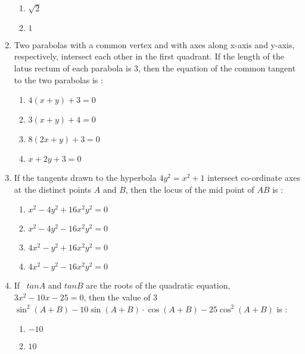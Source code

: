 \documentclass[journal,12pt,twocolumn]{IEEEtran}
\begin{document}
\begin{enumerate}[1.]
\begin{enumerate}[(1)]
\item $
\sqrt{2}
$

\item $
1
$


\end{enumerate}

\item Two parabolas with a common vertex and with axes along x-axis and y-axis, respectively, intersect each other in the first quadrant. If the length of the latus rectum of each parabola is $3$, then the equation of the common tangent to the two parabolas is :


\begin{enumerate}[(1)]
 
\item $
4(x+y)+3=0
$

\item $
3(x+y)+4=0
$

\item $
8(2x+y)+3=0
$

\item $
x+2y+3=0
$


\end{enumerate}

\item If the tangents drawn to the hyperbola $4y^2=x^2+1$ intersect co-ordinate axes at the distinct points $A$ and $B$, then the locus of the mid point of $AB$ is :


\begin{enumerate}[(1)]
 
\item $
x^2-4y^2+16x^2y^2=0
$

\item $
x^2-4y^2-16x^2y^2=0
$

\item $
4x^2-y^2+16x^2y^2=0
$

\item $
4x^2-y^2-16x^2y^2=0
$


\end{enumerate}


\item If \ $tanA$ and $tanB$ are the roots of the quadratic equation, $3x^2-10x-25=0$, then the value of $3$ $\sin^2(A+B)-10 \sin(A+B) \cdot \cos(A+B)-25 \cos^2(A+B) $ is :


\begin{enumerate}[(1)]
 
\item $
-10
$

\item $
10
$


\end{enumerate}
\end{enumerate}
\end{document}

